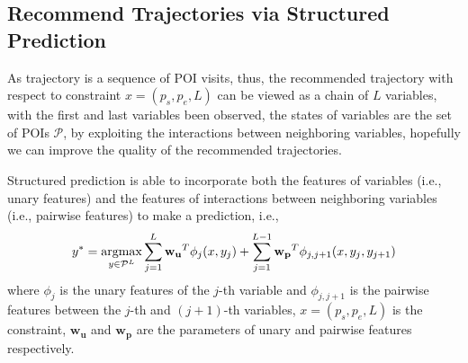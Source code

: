 \subsection{Recommend Trajectories via Structured \\ Prediction}
\label{method:structured}
As trajectory is a sequence of POI visits,
thus, the recommended trajectory with respect to constraint $x = (p_s, p_e, L)$ 
can be viewed as a chain of $L$ variables, 
with the first and last variables been observed, the states of variables are the set of POIs $\mathcal{P}$,
by exploiting the interactions between neighboring variables, 
hopefully we can improve the quality of the recommended trajectories.

Structured prediction is able to incorporate both the features of variables (i.e., unary features) and 
the features of interactions between neighboring variables (i.e., pairwise features) to make a prediction, i.e.,
\begin{displaymath}
    y^* = \operatorname*{argmax}_{y \in \mathcal{P}^L} \sum_{j=1}^L \mathbf{w_u}^T \phi_j(x, y_j) + 
                                        \sum_{j=1}^{L-1} \mathbf{w_p}^T \phi_{j, j+1}(x, y_j, y_{j+1})
\end{displaymath}
where $\phi_j$ is the unary features of the $j$-th variable and $\phi_{j, j+1}$ is the pairwise features between
the $j$-th and $(j+1)$-th variables, $x = (p_s, p_e, L)$ is the constraint, $\mathbf{w_u}$ and $\mathbf{w_p}$ are the 
parameters of unary and pairwise features respectively.

